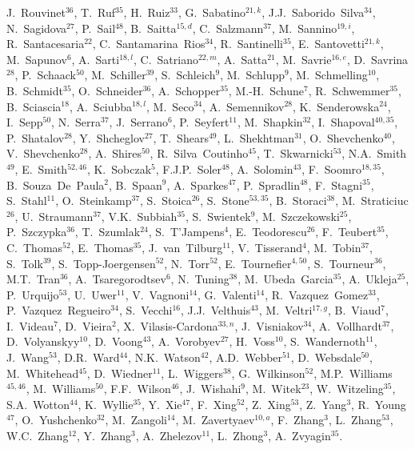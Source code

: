 \documentclass[12pt,a4paper]{article}
\begin{document}
\begin{titlepage}
\begin{center}
\begin{flushleft}
J.~Rouvinet$^{36}$, 
T.~Ruf$^{35}$, 
H.~Ruiz$^{33}$, 
G.~Sabatino$^{21,k}$, 
J.J.~Saborido~Silva$^{34}$, 
N.~Sagidova$^{27}$, 
P.~Sail$^{48}$, 
B.~Saitta$^{15,d}$, 
C.~Salzmann$^{37}$, 
M.~Sannino$^{19,i}$, 
R.~Santacesaria$^{22}$, 
C.~Santamarina~Rios$^{34}$, 
R.~Santinelli$^{35}$, 
E.~Santovetti$^{21,k}$, 
M.~Sapunov$^{6}$, 
A.~Sarti$^{18,l}$, 
C.~Satriano$^{22,m}$, 
A.~Satta$^{21}$, 
M.~Savrie$^{16,e}$, 
D.~Savrina$^{28}$, 
P.~Schaack$^{50}$, 
M.~Schiller$^{39}$, 
S.~Schleich$^{9}$, 
M.~Schlupp$^{9}$, 
M.~Schmelling$^{10}$, 
B.~Schmidt$^{35}$, 
O.~Schneider$^{36}$, 
A.~Schopper$^{35}$, 
M.-H.~Schune$^{7}$, 
R.~Schwemmer$^{35}$, 
B.~Sciascia$^{18}$, 
A.~Sciubba$^{18,l}$, 
M.~Seco$^{34}$, 
A.~Semennikov$^{28}$, 
K.~Senderowska$^{24}$, 
I.~Sepp$^{50}$, 
N.~Serra$^{37}$, 
J.~Serrano$^{6}$, 
P.~Seyfert$^{11}$, 
M.~Shapkin$^{32}$, 
I.~Shapoval$^{40,35}$, 
P.~Shatalov$^{28}$, 
Y.~Shcheglov$^{27}$, 
T.~Shears$^{49}$, 
L.~Shekhtman$^{31}$, 
O.~Shevchenko$^{40}$, 
V.~Shevchenko$^{28}$, 
A.~Shires$^{50}$, 
R.~Silva~Coutinho$^{45}$, 
T.~Skwarnicki$^{53}$, 
N.A.~Smith$^{49}$, 
E.~Smith$^{52,46}$, 
K.~Sobczak$^{5}$, 
F.J.P.~Soler$^{48}$, 
A.~Solomin$^{43}$, 
F.~Soomro$^{18,35}$, 
B.~Souza~De~Paula$^{2}$, 
B.~Spaan$^{9}$, 
A.~Sparkes$^{47}$, 
P.~Spradlin$^{48}$, 
F.~Stagni$^{35}$, 
S.~Stahl$^{11}$, 
O.~Steinkamp$^{37}$, 
S.~Stoica$^{26}$, 
S.~Stone$^{53,35}$, 
B.~Storaci$^{38}$, 
M.~Straticiuc$^{26}$, 
U.~Straumann$^{37}$, 
V.K.~Subbiah$^{35}$, 
S.~Swientek$^{9}$, 
M.~Szczekowski$^{25}$, 
P.~Szczypka$^{36}$, 
T.~Szumlak$^{24}$, 
S.~T'Jampens$^{4}$, 
E.~Teodorescu$^{26}$, 
F.~Teubert$^{35}$, 
C.~Thomas$^{52}$, 
E.~Thomas$^{35}$, 
J.~van~Tilburg$^{11}$, 
V.~Tisserand$^{4}$, 
M.~Tobin$^{37}$, 
S.~Tolk$^{39}$, 
S.~Topp-Joergensen$^{52}$, 
N.~Torr$^{52}$, 
E.~Tournefier$^{4,50}$, 
S.~Tourneur$^{36}$, 
M.T.~Tran$^{36}$, 
A.~Tsaregorodtsev$^{6}$, 
N.~Tuning$^{38}$, 
M.~Ubeda~Garcia$^{35}$, 
A.~Ukleja$^{25}$, 
P.~Urquijo$^{53}$, 
U.~Uwer$^{11}$, 
V.~Vagnoni$^{14}$, 
G.~Valenti$^{14}$, 
R.~Vazquez~Gomez$^{33}$, 
P.~Vazquez~Regueiro$^{34}$, 
S.~Vecchi$^{16}$, 
J.J.~Velthuis$^{43}$, 
M.~Veltri$^{17,g}$, 
B.~Viaud$^{7}$, 
I.~Videau$^{7}$, 
D.~Vieira$^{2}$, 
X.~Vilasis-Cardona$^{33,n}$, 
J.~Visniakov$^{34}$, 
A.~Vollhardt$^{37}$, 
D.~Volyanskyy$^{10}$, 
D.~Voong$^{43}$, 
A.~Vorobyev$^{27}$, 
H.~Voss$^{10}$, 
S.~Wandernoth$^{11}$, 
J.~Wang$^{53}$, 
D.R.~Ward$^{44}$, 
N.K.~Watson$^{42}$, 
A.D.~Webber$^{51}$, 
D.~Websdale$^{50}$, 
M.~Whitehead$^{45}$, 
D.~Wiedner$^{11}$, 
L.~Wiggers$^{38}$, 
G.~Wilkinson$^{52}$, 
M.P.~Williams$^{45,46}$, 
M.~Williams$^{50}$, 
F.F.~Wilson$^{46}$, 
J.~Wishahi$^{9}$, 
M.~Witek$^{23}$, 
W.~Witzeling$^{35}$, 
S.A.~Wotton$^{44}$, 
K.~Wyllie$^{35}$, 
Y.~Xie$^{47}$, 
F.~Xing$^{52}$, 
Z.~Xing$^{53}$, 
Z.~Yang$^{3}$, 
R.~Young$^{47}$, 
O.~Yushchenko$^{32}$, 
M.~Zangoli$^{14}$, 
M.~Zavertyaev$^{10,a}$, 
F.~Zhang$^{3}$, 
L.~Zhang$^{53}$, 
W.C.~Zhang$^{12}$, 
Y.~Zhang$^{3}$, 
A.~Zhelezov$^{11}$, 
L.~Zhong$^{3}$, 
A.~Zvyagin$^{35}$.\bigskip


\end{flushleft}
\end{center}
\end{titlepage}
\end{document}
